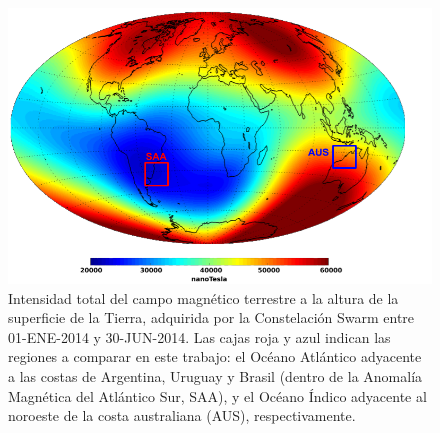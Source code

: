     \begin{figure}
    \centering
    \includegraphics[width=\textwidth]{ppe/figures/ppeMagnetic.png}
    \caption[Intensidad total del campo magnético terrestre a la altura de la superficie terrestre.]{Intensidad total del campo magnético terrestre a la altura de la superficie de la Tierra, adquirida por la Constelación Swarm entre 01-ENE-2014 y 30-JUN-2014. Las cajas roja y azul indican las regiones a comparar en este trabajo: el Océano Atlántico adyacente a las costas de Argentina, Uruguay y Brasil (dentro de la Anomalía Magnética del Atlántico Sur, SAA), y el Océano Índico adyacente al noroeste de la costa australiana (AUS), respectivamente.}
    \label{ppe:ppeMagnetic}
    \end{figure}
    
